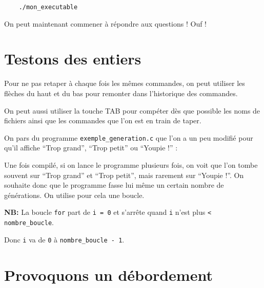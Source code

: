 \documentclass[10pt]{article}
\begin{document}
\begin{verbatim}
    ./mon_executable
\end{verbatim}

On peut maintenant commener à répondre aux questions ! Ouf !

\section{Testons des entiers}

\begin{enumerate}[label=\textbf{[\alph*]}]
  \setlength\itemsep{1em}

\item Pour ne pas retaper à chaque fois les mêmes commandes, on peut
  utiliser les flèches du haut et du bas pour remonter dans
  l'historique des commandes.

  On peut aussi utiliser la touche TAB pour compéter dès que possible
  les noms de fichiers ainsi que les commandes que l'on est en train
  de taper.

\item On pars du programme {\tt exemple\_generation.c} que l'on a un
  peu modifié pour qu'il affiche ``Trop grand'', ``Trop petit'' ou
  ``Youpie !'' :

  

  Une fois compilé, si on lance le programme plusieurs fois, on voit
  que l'on tombe souvent sur ``Trop grand'' et ``Trop petit'', mais
  rarement sur ``Youpie !''. On souhaite donc que le programme fasse
  lui même un certain nombre de générations. On utilise pour cela une
  boucle.

  

  \textbf{NB:} La boucle {\tt for} part de {\tt i = 0} et s'arrête
  quand {\tt i} n'est plus {\tt < nombre\_boucle}.

  Donc {\tt i} va de {\tt 0} à {\tt nombre\_boucle - 1}.

\end{enumerate}

\newpage

\section{Provoquons un débordement}
\end{document}
